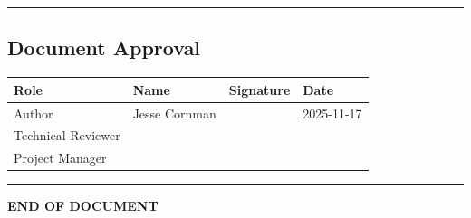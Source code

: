\documentclass[
  11pt,
]{article}
\newcounter{none} %
\begin{document}
\begin{center}\rule{0.5\linewidth}{0.5pt}\end{center}

\subsection{Document Approval}\label{document-approval}

{\def\LTcaptype{none} %
\begin{longtable}[]{@{}llll@{}}
\toprule\noalign{}
Role & Name & Signature & Date \\
\midrule\noalign{}
\endhead
\bottomrule\noalign{}
\endlastfoot
Author & Jesse Cornman & & 2025-11-17 \\
Technical Reviewer & & & \\
Project Manager & & & \\
\end{longtable}
}

\begin{center}\rule{0.5\linewidth}{0.5pt}\end{center}

\textbf{END OF DOCUMENT}
\end{document}
